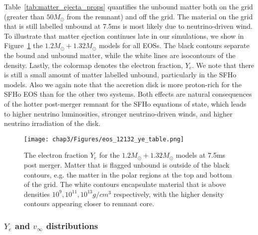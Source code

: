 Table~\ref{tab:matter_ejecta_props} quantifies the unbound matter both on the grid (greater than $50M_\odot$ from the remnant) and off the grid. The material on the grid that is still labelled unbound at 7.5ms is most likely due to neutrino-driven wind. To illustrate that matter ejection continues late in our simulations, we show in Figure~\ref{fig:ye_table_eos_12132}  the $1.2M_\odot + 1.32M_\odot$ models for all EOSs. The black contours separate the bound and
unbound matter, while the white lines are isocontours of the density. Lastly, the colormap denotes the electron fraction, $Y_e$. We note that there is still a small amount of matter labelled unbound, particularly in the SFHo models. Also we again note that the accretion disk is more proton-rich for the SFHo EOS than for the other two systems. Both effects are natural consequences of the hotter post-merger remnant for the SFHo equations of state, which leads to higher neutrino luminosities, stronger neutrino-driven winds, and higher neutrino irradiation of the disk.

\begin{figure}[!htbp]
  \centering
\texttt{[image: chap3/Figures/eos\_12132\_ye\_table.png]}
\caption{
  The electron fraction $Y_e$ for the $1.2M_\odot + 1.32M_\odot$ models at 7.5ms post merger. Matter that is flagged unbound is outside of the black contours, e.g. the matter in the polar regions at the top and bottom of the grid. The white contours encapsulate material that is above densities
$10^{9}, 10^{11}, 10^{13} g/cm^3$ respectively, with the higher density contours appearing closer to remnant core.
}
\label{fig:ye_table_eos_12132}
\end{figure}

%
\subsubsection{$Y_e$ and $v_\infty$ distributions}

